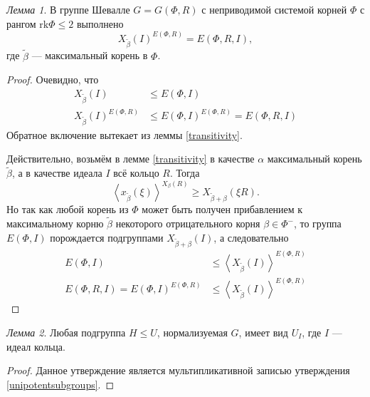 \documentclass[10pt]{article}
\theoremstyle{break}
\theoremstyle{remark}
\newtheorem{lm}{Лемма}
\renewcommand{\le}{\leqslant}
\renewcommand{\ge}{\geqslant}
\begin{document}
\begin{lm} \label{maximalgenerates}
  В группе Шевалле $G=G(\Phi,R)$ с неприводимой системой корней $\Phi$ с рангом $\mathrm{rk}\Phi \le 2$ выполнено
  $$X_{\widetilde\beta}(I)^{E(\Phi,R)} = E(\Phi,R,I),$$
  где $\widetilde\beta$ --- максимальный корень в $\Phi$.
\end{lm}
\begin{proof}
  Очевидно, что
\begin{align*}
  X_{\widetilde\beta}(I) &\le E(\Phi,I) \\
  X_{\widetilde\beta}(I)^{E(\Phi,R)} &\le E(\Phi,I)^{E(\Phi,R)} = E(\Phi,R,I)
\end{align*}
  Обратное включение вытекает из леммы \ref{transitivity}.
  
  Действительно, возьмём в лемме \ref{transitivity} в качестве $\alpha$ максимальный корень $\widetilde{\beta}$, а в качестве идеала $I$ всё кольцо $R$. Тогда
  $$ \left< x_{\widetilde\beta}(\xi) \right>^{X_\beta(R)} \ge X_{\widetilde\beta + \beta}(\xi R). $$
  Но так как любой корень из $\Phi$ может быть получен прибавлением к максимальному корню $\widetilde\beta$ некоторого отрицательного корня $\beta \in \Phi^-$, то группа $E(\Phi,I)$ порождается подгруппами $X_{\widetilde\beta + \beta}(I)$, а следовательно 
\begin{align*}
E(\Phi,I) &\le \left< X_{\widetilde\beta}(I) \right>^{E(\Phi,R)}\\
  E(\Phi,R,I) = E(\Phi,I)^{E(\Phi,R)} &\le \left< X_{\widetilde\beta}(I) \right>^{E(\Phi,R)}
\end{align*}
\end{proof}


\begin{lm}\label{unipotenttransitivity}
  Любая подгруппа $H \le U$, нормализуемая $G$, имеет вид $U_I$, где $I$ --- идеал кольца.
\end{lm}
\begin{proof}
  Данное утверждение является мультипликативной записью утверждения \ref{unipotentsubgroups}.
\end{proof}
\end{document}
